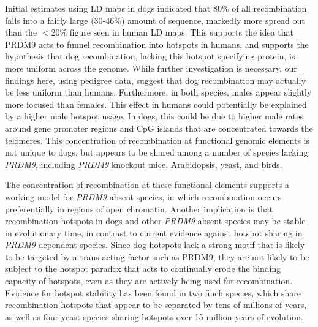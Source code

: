 Initial estimates using LD maps in dogs indicated that 80\% of all recombination falls into a fairly large (30-46\%) amount of sequence\cite{Axelsson2012,Auton2013}, markedly more spread out than the $<$20\% figure seen in human LD maps\cite{hapmap2007}.
This supports the idea that PRDM9 acts to funnel recombination into hotspots in humans, and supports the hypothesis that dog recombination, lacking this hotspot specifying protein, is more uniform across the genome.
While further investigation is necessary,
our findings here, using pedigree data, suggest that dog recombination may actually be less uniform than humans.
Furthermore, in both species, males appear slightly more focused than females.  
This effect in humans could potentially be explained by a higher male hotspot usage\cite{Campbell2015}.
In dogs, this could be due to higher male rates around gene promoter regions and CpG islands that are concentrated towards the telomeres.
This concentration of recombination at functional genomic elements is not unique to dogs, but appears to be shared among a number of species lacking \textit{PRDM9}, including \textit{PRDM9} knockout mice\cite{Brick2012},
Arabidopsis, yeast\cite{Lam2015}, and birds\cite{Singhal2015}.

The concentration of recombination at these functional elements
supports a working model for \textit{PRDM9}-absent species, in which recombination occurs preferentially in regions of open chromatin.
Another implication is that recombination hotspots in dogs and other \textit{PRDM9}-absent species may be stable in evolutionary time, in contrast to current evidence against hotspot sharing in \textit{PRDM9} dependent species.
Since dog hotspots lack a strong motif that is likely to be targeted by a trans acting factor such as PRDM9\cite{Axelsson2012,Auton2013}, they are not likely to be subject to the hotspot paradox that acts to continually erode the binding capacity of hotspots, even as they are actively being used for recombination\cite{Myers2010}.
Evidence for hotspot stability has been found in two finch species, which share recombination hotspots that appear to be separated by tens of millions of years\cite{Singhal2015}, as well as four yeast species sharing hotspots over 15 million years of evolution\cite{Lam2015}.






